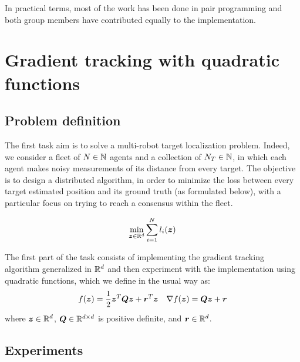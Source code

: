 \documentclass[a4paper,11pt,oneside]{book}
\begin{document}
In practical terms, most of the work has been done in pair programming and both group members have contributed equally to the implementation.





\setcounter{page}{1}
\chapter{Gradient tracking with quadratic functions} \label{ch:quadratic}


\section{Problem definition}

The first task aim is to solve a multi-robot target localization problem. Indeed, we consider a fleet of $N \in {\mathbb{N}}$ agents and a collection of $N_T \in {\mathbb{N}}$, in which each agent makes noisy measurements of its distance from every target. The objective is to design a distributed algorithm, in order to minimize the loss between every target estimated position and its ground truth (as formulated below), with a particular focus on trying to reach a consensus within the fleet.

\[
      \min_{{\bm{z}} \in {\mathbb{R}}^{d}} \sum_{i=1}^{N} l_i({\bm{z}})
\]


The first part of the task consists of implementing the gradient tracking algorithm generalized in ${\mathbb{R}}^d$ and then experiment with the implementation using quadratic functions, which we define in the usual way as:
\[
      f({\bm{z}}) = \frac{1}{2} {\bm{z}}^T {\bm{Q}} {\bm{z}} + {\bm{r}}^T {\bm{z}}
      \quad
      \nabla f({\bm{z}}) = {\bm{Q}} {\bm{z}} + {\bm{r}}
\]
where ${\bm{z}} \in {\mathbb{R}}^{d}$, ${\bm{Q}} \in {\mathbb{R}}^{d \times d}$ is positive definite, and ${\bm{r}} \in {\mathbb{R}}^{d}$.


\section{Experiments}
\end{document}
